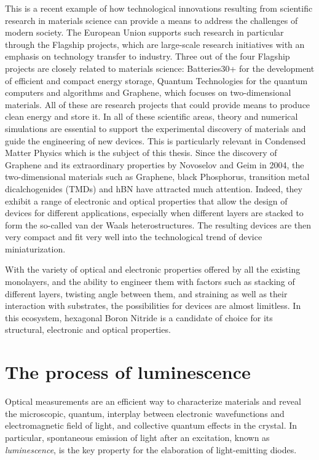 This is a recent example of how technological innovations resulting from scientific research in materials science can provide a means to address the challenges of modern society. The European Union supports such research in particular through the Flagship projects, which are large-scale research initiatives with an emphasis on technology transfer to industry. Three out of the four Flagship projects are closely related to materials science: Batteries30+ for the development of efficient and compact energy storage,\cite{batteries_flagship} Quantum Technologies\cite{quantum_flagship} for the quantum computers and algorithms and Graphene,\cite{graphene_flagship} which focuses on two-dimensional materials. All of these are research projects that could provide means to produce clean energy and store it. In all of these scientific areas, theory and numerical simulations are essential to support the experimental discovery of materials and guide the engineering of new devices. This is particularly relevant in Condensed Matter Physics which is the subject of this thesis. Since the discovery of Graphene and its extraordinary properties by Novoselov and Geim in 2004,\cite{novoselov2004electric} the two-dimensional materials such as Graphene, black Phosphorus, transition metal dicalchogenides (TMDs) and \acrfull{hBN} have attracted much attention. Indeed, they exhibit a range of electronic and optical properties that allow the design of devices for different applications, especially when different layers are stacked to form the so-called van der Waals heterostructures.\cite{geim2013van} The resulting devices are then very compact and fit very well into the technological trend of device miniaturization.

With the variety of optical and electronic properties offered by all the existing monolayers, and the ability to engineer them with factors such as stacking of different layers,\cite{sponza2018direct} twisting angle between them,\cite{latil2023structural, impellizzeri2022electronic} and straining\cite{blundo2021strain} as well as their interaction with substrates, the possibilities for devices are almost limitless. In this ecosystem, hexagonal Boron Nitride is a candidate of choice for its structural, electronic and optical properties.

% 


\section*{The process of luminescence}
Optical measurements are an efficient way to characterize materials and reveal the microscopic, quantum, interplay between electronic wavefunctions and electromagnetic field of light, and collective quantum effects in the crystal.\cite{dressel2002electrodynamics} In particular, spontaneous emission of light after an excitation, known as \textit{luminescence}, is the key property for the elaboration of light-emitting diodes.\cite{pelant2012luminescence}

